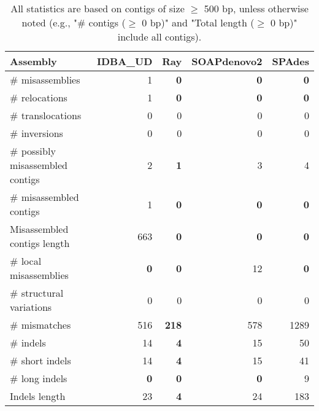 \documentclass[12pt,a4paper]{article}
\begin{document}
\begin{table}[ht]
\begin{center}
\caption{All statistics are based on contigs of size $\geq$ 500 bp, unless otherwise noted (e.g., "\# contigs ($\geq$ 0 bp)" and "Total length ($\geq$ 0 bp)" include all contigs).}
\begin{tabular}{|l*{4}{|r}|}
\hline
Assembly & IDBA\_UD & Ray & SOAPdenovo2 & SPAdes \\ \hline
\# misassemblies & 1 & {\bf 0} & {\bf 0} & {\bf 0} \\ \hline
\hspace{5mm}\# relocations & 1 & {\bf 0} & {\bf 0} & {\bf 0} \\ \hline
\hspace{5mm}\# translocations & 0 & 0 & 0 & 0 \\ \hline
\hspace{5mm}\# inversions & 0 & 0 & 0 & 0 \\ \hline
\# possibly misassembled contigs & 2 & {\bf 1} & 3 & 4 \\ \hline
\# misassembled contigs & 1 & {\bf 0} & {\bf 0} & {\bf 0} \\ \hline
Misassembled contigs length & 663 & {\bf 0} & {\bf 0} & {\bf 0} \\ \hline
\# local misassemblies & {\bf 0} & {\bf 0} & 12 & {\bf 0} \\ \hline
\# structural variations & 0 & 0 & 0 & 0 \\ \hline
\# mismatches & 516 & {\bf 218} & 578 & 1289 \\ \hline
\# indels & 14 & {\bf 4} & 15 & 50 \\ \hline
\hspace{5mm}\# short indels & 14 & {\bf 4} & 15 & 41 \\ \hline
\hspace{5mm}\# long indels & {\bf 0} & {\bf 0} & {\bf 0} & 9 \\ \hline
Indels length & 23 & {\bf 4} & 24 & 183 \\ \hline
\end{tabular}
\end{center}
\end{table}
\end{document}
